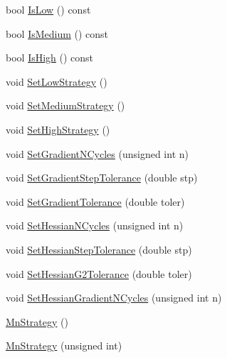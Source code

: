 \begin{DoxyCompactItemize}
\item 
bool \mbox{\hyperlink{classROOT_1_1Minuit2_1_1MnStrategy_a5b777bca218ea524454f304e67fbbf83}{Is\+Low}} () const
\item 
bool \mbox{\hyperlink{classROOT_1_1Minuit2_1_1MnStrategy_a83e9fa3f54c51bbf7f54de2096d75cfe}{Is\+Medium}} () const
\item 
bool \mbox{\hyperlink{classROOT_1_1Minuit2_1_1MnStrategy_a49f91ddb7327a651bc0580e644acc8fb}{Is\+High}} () const
\item 
void \mbox{\hyperlink{classROOT_1_1Minuit2_1_1MnStrategy_a24671e2ae8a1224583adfcb3fb73ad55}{Set\+Low\+Strategy}} ()
\item 
void \mbox{\hyperlink{classROOT_1_1Minuit2_1_1MnStrategy_ae813d1aedcf6fa8f2bfb09a501a783f4}{Set\+Medium\+Strategy}} ()
\item 
void \mbox{\hyperlink{classROOT_1_1Minuit2_1_1MnStrategy_a92e5deb2087eec6e0d7db5d5789f3a06}{Set\+High\+Strategy}} ()
\item 
void \mbox{\hyperlink{classROOT_1_1Minuit2_1_1MnStrategy_abf74d8c002c658339f15df4b56aa4fdb}{Set\+Gradient\+N\+Cycles}} (unsigned int n)
\item 
void \mbox{\hyperlink{classROOT_1_1Minuit2_1_1MnStrategy_ad6051100db67df070103c2478740ee8f}{Set\+Gradient\+Step\+Tolerance}} (double stp)
\item 
void \mbox{\hyperlink{classROOT_1_1Minuit2_1_1MnStrategy_aa7e6c4626962cd81e05821955ff562aa}{Set\+Gradient\+Tolerance}} (double toler)
\item 
void \mbox{\hyperlink{classROOT_1_1Minuit2_1_1MnStrategy_a7d97d197e18c686e2cdb826ea514de28}{Set\+Hessian\+N\+Cycles}} (unsigned int n)
\item 
void \mbox{\hyperlink{classROOT_1_1Minuit2_1_1MnStrategy_a8711f7c9983983c83fd5d192bc9304f7}{Set\+Hessian\+Step\+Tolerance}} (double stp)
\item 
void \mbox{\hyperlink{classROOT_1_1Minuit2_1_1MnStrategy_aed3f2b229af4c5a4091507830f4275e0}{Set\+Hessian\+G2\+Tolerance}} (double toler)
\item 
void \mbox{\hyperlink{classROOT_1_1Minuit2_1_1MnStrategy_ad8984d94901eaf8cad19fe49647449bf}{Set\+Hessian\+Gradient\+N\+Cycles}} (unsigned int n)
\item 
\mbox{\hyperlink{classROOT_1_1Minuit2_1_1MnStrategy_a231337ee8aec47874370bc4b64683374}{Mn\+Strategy}} ()
\item 
\mbox{\hyperlink{classROOT_1_1Minuit2_1_1MnStrategy_ad70367966dc3b7cdf1be671acb3824d0}{Mn\+Strategy}} (unsigned int)
\item 

\end{DoxyCompactItemize}
